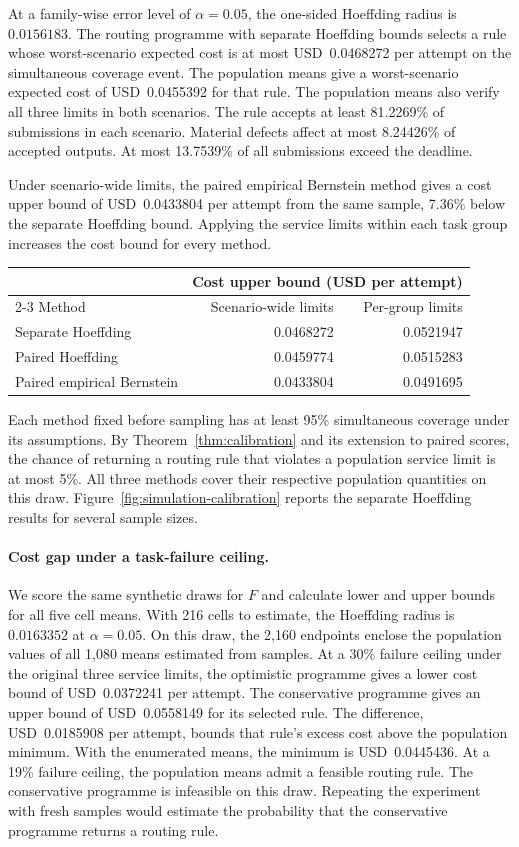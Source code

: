 \documentclass[11pt,reqno]{amsart}
\theoremstyle{definition}
\theoremstyle{remark}
\begin{document}
At a family-wise error level of $\alpha=0.05$, the one-sided Hoeffding radius is $0.0156183$.
The routing programme with separate Hoeffding bounds selects a rule whose worst-scenario expected cost is at most USD~0.0468272 per attempt on the simultaneous coverage event. The population means give a worst-scenario expected cost of USD~0.0455392 for that rule.
The population means also verify all three limits in both scenarios. The rule accepts at least 81.2269\% of submissions in each scenario. Material defects affect at most 8.24426\% of accepted outputs. At most 13.7539\% of all submissions exceed the deadline.

Under scenario-wide limits, the paired empirical Bernstein method gives a cost upper bound of USD~0.0433804 per attempt from the same sample, 7.36\% below the separate Hoeffding bound.
Applying the service limits within each task group increases the cost bound for every method.
\begin{center}
\small
\begin{tabular}{@{}lrr@{}}
\toprule
 & \multicolumn{2}{c}{Cost upper bound (USD per attempt)}\\
\cmidrule(l){2-3}
Method & Scenario-wide limits & Per-group limits\\
\midrule
Separate Hoeffding & 0.0468272 & 0.0521947\\
Paired Hoeffding & 0.0459774 & 0.0515283\\
Paired empirical Bernstein & 0.0433804 & 0.0491695\\
\bottomrule
\end{tabular}
\end{center}
Each method fixed before sampling has at least 95\% simultaneous coverage under its assumptions. By Theorem~\ref{thm:calibration} and its extension to paired scores, the chance of returning a routing rule that violates a population service limit is at most 5\%. All three methods cover their respective population quantities on this draw. Figure~\ref{fig:simulation-calibration} reports the separate Hoeffding results for several sample sizes.

\paragraph{Cost gap under a task-failure ceiling.}
We score the same synthetic draws for $F$ and calculate lower and upper bounds for all five cell means. With 216 cells to estimate, the Hoeffding radius is $0.0163352$ at $\alpha=0.05$. On this draw, the 2,160 endpoints enclose the population values of all 1,080 means estimated from samples.
At a 30\% failure ceiling under the original three service limits, the optimistic programme gives a lower cost bound of USD~0.0372241 per attempt. The conservative programme gives an upper bound of USD~0.0558149 for its selected rule. The difference, USD~0.0185908 per attempt, bounds that rule's excess cost above the population minimum. With the enumerated means, the minimum is USD~0.0445436.
At a 19\% failure ceiling, the population means admit a feasible routing rule. The conservative programme is infeasible on this draw. Repeating the experiment with fresh samples would estimate the probability that the conservative programme returns a routing rule.
\end{document}
